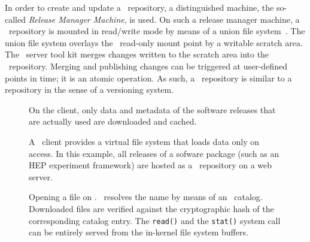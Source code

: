 In order to create and update a \cvmfs\ repository, a distinguished machine, the so-called \emph{Release Manager Machine}, is used.
On such a release manager machine, a \cvmfs\ repository is mounted in read/write mode by means of a union file system~\cite{unionfs04}.
The union file system overlays the \cvmfs\ read-only mount point by a writable scratch area.
The \cvmfs\ server tool kit merges changes written to the scratch area into the \cvmfs\ repository.
Merging and publishing changes can be triggered at user-defined points in time; it is an atomic operation.
As such, a \cvmfs\ repository is similar to a repository in the sense of a versioning system.

\begin{figure}
	\begin{center}
		\resizebox{\textwidth}{!}{}
	\end{center}
	\caption{A \cvmfs\ client provides a virtual file system that loads data only on access.  
		In this example, all releases of a sofware package (such as an HEP experiment framework) are hosted as a \cvmfs\ repository on a web server.}
		On the client, only data and metadata of the software releases that are actually used are downloaded and cached.
	\label{fig:concept}
\end{figure}

\begin{figure}
	\begin{center}
		
	\end{center}
	\caption{Opening a file on \cvmfs. \cvmfs\ resolves the name by means of an \sqlite\ catalog. 
		Downloaded files are verified against the cryptographic hash of the corresponding catalog entry. 
		The \texttt{read()} and the \texttt{stat()} system call can be entirely served from the in-kernel file system buffers.}
	\label{fig:fuse}
\end{figure}

